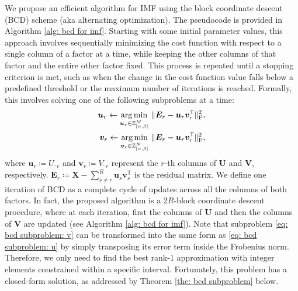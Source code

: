 We propose an efficient algorithm for IMF using the block coordinate descent (BCD) scheme (aka alternating optimization). 
The pseudocode is provided in Algorithm \ref{alg: bcd for imf}.
Starting with some initial parameter values, this approach involves sequentially minimizing the cost function with respect to a single column of a factor at a time, while keeping the other columns of that factor and the entire other factor fixed. This process is repeated until a stopping criterion is met, such as when the change in the cost function value falls below a predefined threshold or the maximum number of iterations is reached. Formally, this involves solving one of the following subproblems at a time:
\begin{align}  
	\bm{u}_r \gets \underset{\bm{u}_r \in \mathbb{Z}_{[\alpha,\beta]}^M}{\operatorname*{arg\,min}} \ \lVert \bm{E}_r - \bm{u}_r \bm{v}_r^\mathsf{T} \rVert_\text{F}^2, \label{eq: bcd subproblem: u} \\
	\bm{v}_r \gets \underset{\bm{v}_r \in \mathbb{Z}_{[\alpha,\beta]}^N}{\operatorname*{arg\,min}} \ \lVert \bm{E}_r - \bm{u}_r \bm{v}_r^\mathsf{T} \rVert_\text{F}^2, \label{eq: bcd subproblem: v}
\end{align}
where $\bm{u}_r \coloneqq U_{:r}$ and $\bm{v}_r \coloneqq V_{:r}$ represent the $r$-th columns of $\bm{U}$ and $\bm{V}$, respectively. $\bm{E}_r \coloneqq \bm{X} - \sum_{s \neq r}^{R} \bm{u}_s \bm{v}_s^\mathsf{T}$ is the residual matrix. We define one iteration of BCD as a complete cycle of updates across all the columns of both factors. In fact, the proposed algorithm is a $2R$-block coordinate descent procedure, where at each iteration, first the columns of $\bm{U}$ and then the columns of $\bm{V}$ are updated (see Algorithm \ref{alg: bcd for imf}). Note that subproblem \eqref{eq: bcd subproblem: v} can be transformed into the same form as \eqref{eq: bcd subproblem: u} by simply transposing its error term inside the Frobenius norm. Therefore, we only need to find the best rank-1 approximation with integer elements constrained within a specific interval. Fortunately, this problem has a closed-form solution, as addressed by Theorem \ref{the: bcd subproblem} below.

